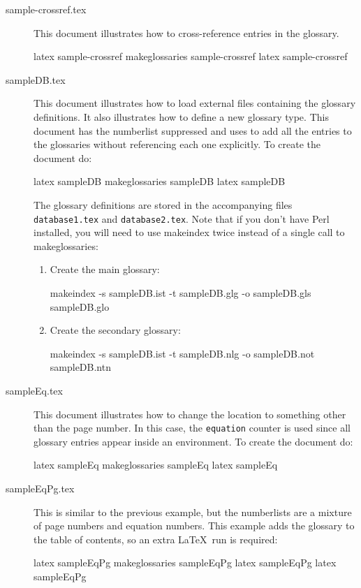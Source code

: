 \documentclass{nlctdoc}
\begin{document}
\begin{description}
\item[sample-crossref.tex]\label{ex:sample-crossref}
This document illustrates how to cross-reference entries in the
glossary.
\begin{prompt}
latex sample-crossref
makeglossaries sample-crossref
latex sample-crossref
\end{prompt}

\item[sampleDB.tex]\label{ex:sampleDB} This document illustrates how
to load external files containing the glossary definitions. It also
illustrates how to define a new glossary type. This document has the
\gls{numberlist} suppressed and uses  to add all
the entries to the glossaries without referencing each one
explicitly. To create the document do:
\begin{prompt}
latex sampleDB
makeglossaries sampleDB
latex sampleDB
\end{prompt}
The glossary definitions are stored in the accompanying files
\texttt{database1.tex} and \texttt{database2.tex}. Note that if you
don't have Perl installed, you will need to use \gls{makeindex}
twice instead of a single call to \gls{makeglossaries}:
\begin{enumerate}
\item Create the main glossary:
\begin{prompt}
makeindex -s sampleDB.ist -t sampleDB.glg -o sampleDB.gls sampleDB.glo
\end{prompt}
\item Create the secondary glossary:
\begin{prompt}
makeindex -s sampleDB.ist -t sampleDB.nlg -o sampleDB.not sampleDB.ntn
\end{prompt}
\end{enumerate}

\item[sampleEq.tex]\label{ex:sampleEq} This document illustrates how
to change the location to something other than the page number. In
this case, the \texttt{equation} counter is used since all glossary
entries appear inside an  environment. To create
the document do:
\begin{prompt}
latex sampleEq
makeglossaries sampleEq
latex sampleEq
\end{prompt}

\item[sampleEqPg.tex]\label{ex:sampleEqPg} This is similar to the
previous example, but the \glspl{numberlist} are a
mixture of page numbers and equation numbers. This example adds the
glossary to the table of contents, so an extra \LaTeX\ run is
required:
\begin{prompt}
latex sampleEqPg
makeglossaries sampleEqPg
latex sampleEqPg
latex sampleEqPg
\end{prompt}


\end{description}
\end{document}
